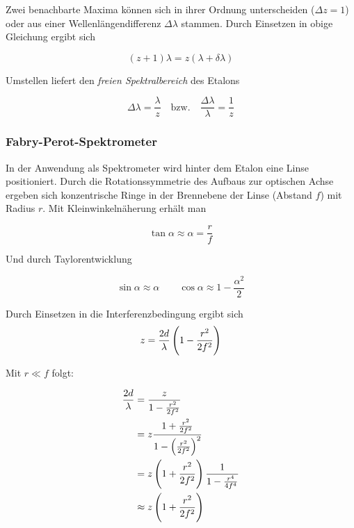\documentclass[a4paper,german,12pt,smallheadings]{scrartcl}
\begin{document}
Zwei benachbarte Maxima können sich in ihrer Ordnung unterscheiden ($\Delta z =
1$) oder aus einer Wellenlängendifferenz $\Delta \lambda$ stammen. Durch
Einsetzen in obige Gleichung ergibt sich

\begin{equation}
  (z+1) \lambda = z (\lambda + \delta \lambda)
\end{equation}

Umstellen liefert den \textit{freien Spektralbereich} des Etalons

\begin{equation}
  \Delta \lambda = \frac{\lambda}{z} \quad \text{bzw.} \quad \frac{\Delta \lambda}{\lambda} = \frac{1}{z}
\end{equation}

\subsubsection{Fabry-Perot-Spektrometer}

In der Anwendung als Spektrometer wird hinter dem Etalon eine Linse
positioniert. Durch die Rotationssymmetrie des Aufbaus zur optischen Achse
ergeben sich konzentrische Ringe in der Brennebene der Linse (Abstand $f$) mit
Radius $r$. Mit Kleinwinkelnäherung erhält man

\begin{equation}
  \tan \alpha \approx \alpha = \frac{r}{f}
\end{equation}

Und durch Taylorentwicklung

\begin{equation}
  \sin \alpha \approx \alpha \qquad \cos \alpha \approx 1 - \frac{\alpha^2}{2}
\end{equation}

Durch Einsetzen in die Interferenzbedingung ergibt sich
\begin{equation}
  z = \frac{2d}{\lambda} \del{1 - \frac{r^2}{2f^2}}
  \label{eq:ord}
\end{equation}

Mit $r \ll f$ folgt:

\begin{align*}
  \frac{2d}{\lambda} &= \frac{z}{1-\frac{r^2}{2f^2}} \\
                     &= z \frac{1+\frac{r^2}{2f^2}}{1 - \del{\frac{r^2}{2f^2}}^2} \\
                     &= z \del{1 + \frac{r^2}{2f^2}} \frac{1}{1 - \frac{r^4}{4f^4}} \\
                     &\approx z \del{1+\frac{r^2}{2f^2}}
\end{align*}
\end{document}
